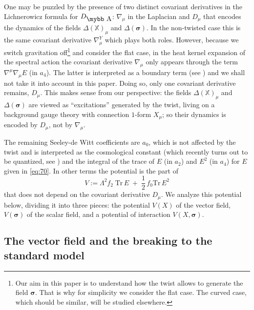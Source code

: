 \documentclass[11pt]{article}
\newcommand{\sig}{{\boldsymbol{\sigma}}}
\newcommand{\XX}{{\mathbb X}}
\def\bb#1{\hbox{\mybb#1}}
\begin{document}
One may be puzzled by the presence of two distinct covariant
derivatives in the Lichnerowicz formula for $D_{\bb A}$:  $\nabla_\mu$
in the Laplacian and $D_\mu$ that encodes the dynamics of the fields $\Delta(\XX)_\mu$ and $\Delta(\sig)$.
In the non-twisted
case this is the same covariant derivative 
$\nabla_\mu^Y$ which plays both roles. However, because we switch 
gravitation off{\footnote{Our aim in this paper is to understand how the twist allows to generate the
field $\sig$. That is why for simplicity  we consider the flat
case. The curved case, which should be similar,  will be studied elsewhere.}} and consider
the flat case, in the heat kernel expansion of the spectral action
the covariant derivative $\nabla_\mu$ only appears through the term
$\nabla^\mu\nabla_\mu E$ (in $a_4$). The latter is interpreted as a
boundary term (see \cite[Rem.1.155]{Connes:2008kx}) and we shall not take it into account in this
paper. Doing so, only one covariant derivative remains, $D_\mu$.
This makes sense from our perspective:  the
fields $\Delta(\XX)_\mu$ and $\Delta(\sig)$ are viewed as ``excitations''
generated by the twist,  living on a background gauge
theory with connection $1$-form $X_\mu$;  so their dynamics is encoded
by $D_\mu$, not by $\nabla_\mu$. 

The remaining Seeley-de Witt
coefficients are $a_0$, which is not affected by the twist and is interpreted as the
cosmological constant (which recently turns out to be quantized, see \cite{quanta-geom})
and the integral of the trace of  $E$ (in $a_2$) and $E^2$ (in $a_4$)
for $E$ given in \eqref{eq:70}. In other terms the potential is the part of 
\begin{equation}
  \label{eq:175}
  V:= \Lambda^2 f_2 \;\text{Tr}\, E \;+ \;\frac 12\, f_0 \text{Tr}\, E^2
\end{equation}
that does not depend on the covariant derivative $D_\mu$. We analyze
this potential below, dividing it into three pieces: the potential $V(X)$ of the vector
field, $V(\sig)$ of the scalar field, and a potential of interaction $V(X,\sig)$.  

\subsection{The vector field and the breaking to the standard
model}
\label{secbreaking}
\end{document}
